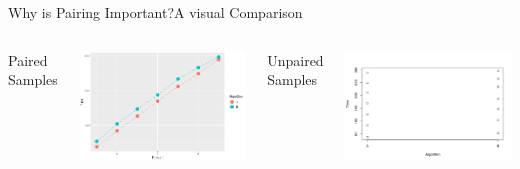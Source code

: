 \begin{frame}{Why is Pairing Important?}{A visual Comparison}
  \begin{columns}
    \begin{center}
      Paired Samples
    \end{center}
    \includegraphics[width=\textwidth]{../img/2samples_paired}
      \begin{center}
        Unpaired Samples
      \end{center}
    \includegraphics[width=\textwidth]{../img/2samples_unpaired}
  \end{columns}
\end{frame}

